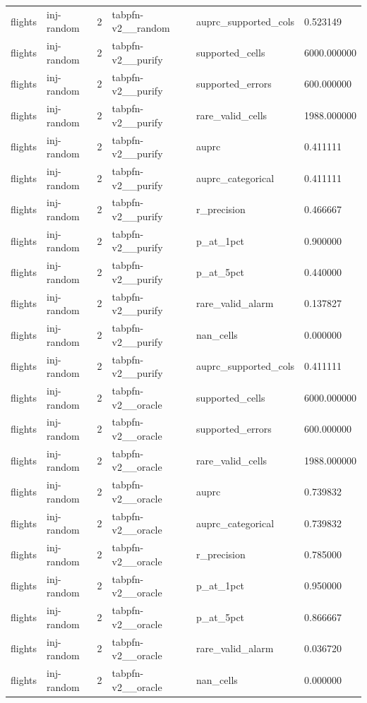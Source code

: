 \begin{tabular}{llllll}
flights & inj-random & 2 & tabpfn-v2\_\_random & auprc\_supported\_cols & 0.523149 \\
flights & inj-random & 2 & tabpfn-v2\_\_purify & supported\_cells & 6000.000000 \\
flights & inj-random & 2 & tabpfn-v2\_\_purify & supported\_errors & 600.000000 \\
flights & inj-random & 2 & tabpfn-v2\_\_purify & rare\_valid\_cells & 1988.000000 \\
flights & inj-random & 2 & tabpfn-v2\_\_purify & auprc & 0.411111 \\
flights & inj-random & 2 & tabpfn-v2\_\_purify & auprc\_categorical & 0.411111 \\
flights & inj-random & 2 & tabpfn-v2\_\_purify & r\_precision & 0.466667 \\
flights & inj-random & 2 & tabpfn-v2\_\_purify & p\_at\_1pct & 0.900000 \\
flights & inj-random & 2 & tabpfn-v2\_\_purify & p\_at\_5pct & 0.440000 \\
flights & inj-random & 2 & tabpfn-v2\_\_purify & rare\_valid\_alarm & 0.137827 \\
flights & inj-random & 2 & tabpfn-v2\_\_purify & nan\_cells & 0.000000 \\
flights & inj-random & 2 & tabpfn-v2\_\_purify & auprc\_supported\_cols & 0.411111 \\
flights & inj-random & 2 & tabpfn-v2\_\_oracle & supported\_cells & 6000.000000 \\
flights & inj-random & 2 & tabpfn-v2\_\_oracle & supported\_errors & 600.000000 \\
flights & inj-random & 2 & tabpfn-v2\_\_oracle & rare\_valid\_cells & 1988.000000 \\
flights & inj-random & 2 & tabpfn-v2\_\_oracle & auprc & 0.739832 \\
flights & inj-random & 2 & tabpfn-v2\_\_oracle & auprc\_categorical & 0.739832 \\
flights & inj-random & 2 & tabpfn-v2\_\_oracle & r\_precision & 0.785000 \\
flights & inj-random & 2 & tabpfn-v2\_\_oracle & p\_at\_1pct & 0.950000 \\
flights & inj-random & 2 & tabpfn-v2\_\_oracle & p\_at\_5pct & 0.866667 \\
flights & inj-random & 2 & tabpfn-v2\_\_oracle & rare\_valid\_alarm & 0.036720 \\
flights & inj-random & 2 & tabpfn-v2\_\_oracle & nan\_cells & 0.000000 \\

\end{tabular}
